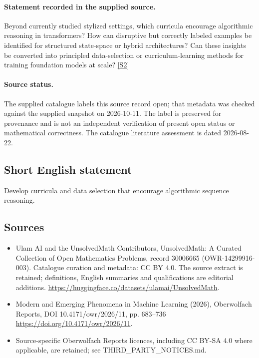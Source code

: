 \documentclass[11pt]{article}
\begin{document}
\paragraph{Statement recorded in the supplied source.}
Beyond currently studied stylized settings, which curricula encourage algorithmic reasoning in transformers? How can disruptive but correctly labeled examples be identified for structured state-space or hybrid architectures? Can these insights be converted into principled data-selection or curriculum-learning methods for training foundation models at scale? \href{https://doi.org/10.4171/owr/2026/11}{[S2]}
\paragraph{Source status.}
The supplied catalogue labels this source record open; that metadata was checked against the supplied snapshot on 2026-10-11. The label is preserved for provenance and is not an independent verification of present open status or mathematical correctness. The catalogue literature assessment is dated 2026-08-22.
\subsection{Short English statement}
Develop curricula and data selection that encourage algorithmic sequence reasoning.
\subsection{Sources}
\begin{itemize}
\item[S1] Ulam AI and the UnsolvedMath Contributors, UnsolvedMath: A Curated Collection of Open Mathematics Problems, record 30006665 (OWR-14299916-003). Catalogue curation and metadata: CC BY 4.0. The source extract is retained; definitions, English summaries and qualifications are editorial additions.
\url{https://huggingface.co/datasets/ulamai/UnsolvedMath}.
\item[S2] Modern and Emerging Phenomena in Machine Learning (2026), Oberwolfach Reports, DOI 10.4171/owr/2026/11, pp. 683--736
\url{https://doi.org/10.4171/owr/2026/11}.
\item Source-specific Oberwolfach Reports licences, including CC BY-SA 4.0 where applicable, are retained; see THIRD\_PARTY\_NOTICES.md.
\end{itemize}
\end{document}
